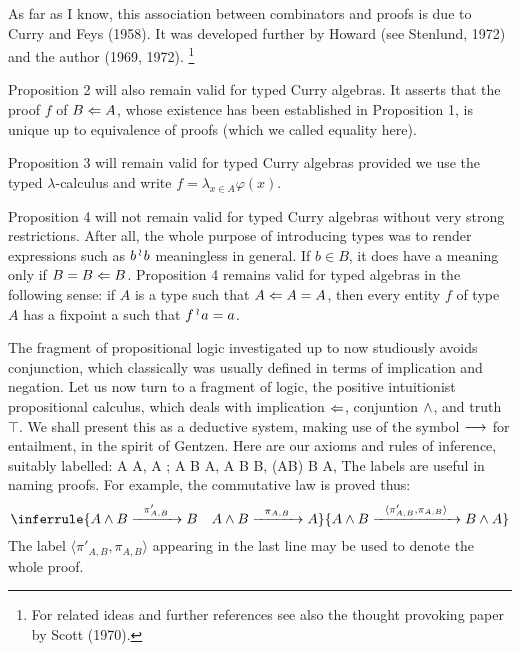 As far as I know, this association between combinators and proofs is due to Curry and Feys (1958).
It was developed further by Howard (see Stenlund, 1972) and the author (1969, 1972).%
\footnote{For related ideas and further references see also the thought provoking paper by Scott (1970).}%

Proposition 2 will also remain valid for typed Curry algebras.
It asserts that the proof $f$ of $B \Leftarrow A$, whose existence has
been established in Proposition 1, is unique up to equivalence of
proofs (which we called equality here).

Proposition 3 will remain valid for typed Curry algebras
provided we use the typed $\lambda$-calculus and write
$f = \lambda_{x \in A} \varphi(x)$.

Proposition 4 will not remain valid for typed Curry algebras without
very strong restrictions. After all, the whole purpose of introducing types was
to render expressions such as $b \mathop{{}^\wr}\kern-.8pt b$ meaningless in general. If $b \in B$, it does have
a meaning only if $B = B \Leftarrow B$. Proposition 4 remains valid for typed algebras in the
following sense: if $A$ is a type such that $A \Leftarrow A = A$, then every entity $f$ of type $A$
has a fixpoint a such that $f\mathop{{}^\wr}\kern-.8pt a= a$.

The fragment of propositional logic investigated up to now studiously avoids
conjunction, which classically was usually defined in terms of implication and negation.
Let us now turn to a fragment of logic, the positive intuitionist propositional calculus,
which deals with implication $\Leftarrow$, conjuntion $\wedge$, and truth $\top$.
We shall present this as a deductive system, making use of the symbol $\longrightarrow$ for entailment,
in the spirit of Gentzen. Here are our axioms and rules of inference, suitably labelled:
\bes
A  A, \qquad {}
\ees
\bes
A  \top;
\ees
\bes
A \sland B  A,\,\,A \sland B  B, \quad
{}
\ees
\bes
(A\from B) \sland B  A, \qquad {}
\ees
The labels are useful in naming proofs. For example, the commutative law is proved thus:
$$
\inferrule{A \sland B \xto{\pi'_{A,B}} B\quad A \sland B \xto{\pi_{A,B}} A}{A \sland B \xto{\langle \pi'_{A,B},\pi_{A,B}\rangle} B\sland A}
$$
The label $\langle \pi'_{A,B},\pi_{A,B}\rangle$ appearing in the last line may be used
to denote the whole proof.

